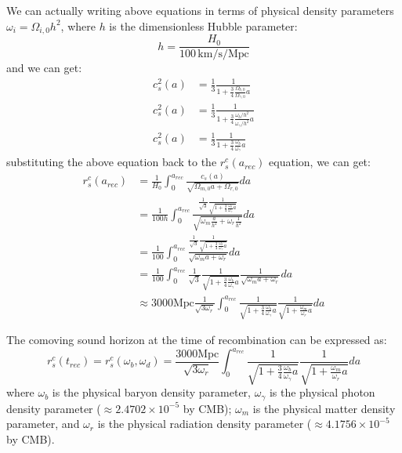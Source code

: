 \begin{foundation}
    We can actually writing above equations in terms of physical density parameters $\omega_i = \Omega_{i,0} h^2$, where $h$ is the dimensionless Hubble parameter:
    \[
        h = \frac{H_0}{100\,\mathrm{km/s/Mpc}}
    \]
    and we can get:
    \begin{align*}
        c_s^2(a) &= \frac{1}{3} \frac{1}{1 + \frac{3}{4} \frac{\Omega_{b,0}}{\Omega_{\gamma,0}} a} \\
        c_s^2(a) &= \frac{1}{3} \frac{1}{1 + \frac{3}{4} \frac{\omega_b / h^2}{\omega_\gamma / h^2} a} \\
        c_s^2(a) &= \frac{1}{3} \frac{1}{1 + \frac{3}{4} \frac{\omega_b}{\omega_\gamma} a}
    \end{align*}
    substituting the above equation back to the $r_s^c(a_{rec})$ equation, we can get:
    \begin{align*}
        r_s^c(a_{rec}) &= \frac{1}{H_0} \int_0^{a_{rec}} \frac{c_s(a)}{\sqrt{\Omega_{m,0} a + \Omega_{r,0}}} da \\
        &= \frac{1}{100 h} \int_0^{a_{rec}} \frac{\frac{1}{\sqrt{3}} \frac{1}{\sqrt{1 + \frac{3}{4} \frac{\omega_b}{\omega_\gamma} a}}}{\sqrt{\omega_{m} \frac{a}{h^2} + \omega_{r} \frac{1}{h^2}}} da \\
        &= \frac{1}{100} \int_0^{a_{rec}} \frac{\frac{1}{\sqrt{3}} \frac{1}{\sqrt{1 + \frac{3}{4} \frac{\omega_b}{\omega_\gamma} a}}}{\sqrt{\omega_{m} a + \omega_{r}}} da \\
        &= \frac{1}{100} \int_0^{a_{rec}} \frac{1}{\sqrt{3}} \frac{1}{\sqrt{1 + \frac{3}{4} \frac{\omega_b}{\omega_\gamma} a}} \frac{1}{\sqrt{\omega_{m} a + \omega_{r}}} da \\
        &\approx 3000 \text{Mpc} \frac{1}{\sqrt{3 \omega_{r}}} \int_0^{a_{rec}} \frac{1}{\sqrt{1 + \frac{3}{4} \frac{\omega_b}{\omega_\gamma} a}} \frac{1}{\sqrt{1 + \frac{\omega_{m}}{\omega_{r}} a}} da
    \end{align*}
\end{foundation}

\bigskip \noindent
\begin{theory}
    The comoving sound horizon at the time of recombination can be expressed as:
    \[
        r_s^c(t_{rec}) = r_s^c(\omega_b, \omega_d) =  \frac{3000 \text{Mpc}}{\sqrt{3 \omega_{r}}} \int_0^{a_{rec}} \frac{1}{\sqrt{1 + \frac{3}{4} \frac{\omega_b}{\omega_\gamma} a}} \frac{1}{\sqrt{1 + \frac{\omega_{m}}{\omega_{r}} a}} da
    \]
    where $\omega_b$ is the physical baryon density parameter, $\omega_\gamma$ is the physical photon density parameter ($ \approx 2.4702 \times 10^{-5}$ by CMB); $\omega_m$ is the physical matter density parameter, and $\omega_r$ is the physical radiation density parameter ($ \approx 4.1756 \times 10^{-5}$ by CMB).
\end{theory}

